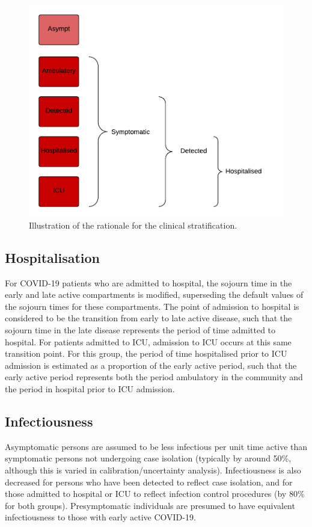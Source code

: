 \begin{figure}[ht]
    \includegraphics[width=\textwidth]{../covid_19/stratifications/covid_19_clinical_rationale.pdf}
	\caption{Illustration of the rationale for the clinical stratification.}
    \label{fig:clinical_rationale}
\end{figure}

\subsection{Hospitalisation} \label{hosp}
For COVID-19 patients who are admitted to hospital, the sojourn time in the early and late active compartments is modified, superseding the default values of the sojourn times for these compartments. The point of admission to hospital is considered to be the transition from early to late active disease, such that the sojourn time in the late disease represents the period of time admitted to hospital. For patients admitted to ICU, admission to ICU occurs at this same transition point. For this group, the period of time hospitalised prior to ICU admission is estimated as a proportion of the early active period, such that the early active period represents both the period ambulatory in the community and the period in hospital prior to ICU admission.

\subsection{Infectiousness} \label{infect}
Asymptomatic persons are assumed to be less infectious per unit time active than symptomatic persons not undergoing case isolation (typically by around 50\%, although this is varied in calibration/uncertainty analysis). Infectiousness is also decreased for persons who have been detected to reflect case isolation, and for those admitted to hospital or ICU to reflect infection control procedures (by 80\% for both groups). Presymptomatic individuals are presumed to have equivalent infectiousness to those with early active COVID-19.

